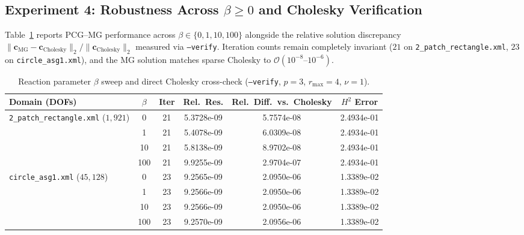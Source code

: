 \documentclass[11pt,a4paper]{article}
\begin{document}
\subsection{Experiment 4: Robustness Across $\beta \ge 0$ and Cholesky Verification}
Table~\ref{tab:beta_verify} reports PCG--MG performance across $\beta \in \{0, 1, 10, 100\}$ alongside the relative solution discrepancy $\|\mathbf{c}_{\mathrm{MG}} - \mathbf{c}_{\mathrm{Cholesky}}\|_2 / \|\mathbf{c}_{\mathrm{Cholesky}}\|_2$ measured via \texttt{--verify}. Iteration counts remain completely invariant ($21$ on \texttt{2\_patch\_rectangle.xml}, $23$ on \texttt{circle\_asg1.xml}), and the MG solution matches sparse Cholesky to $\mathcal{O}(10^{-8}\text{--}10^{-6})$.

\begin{table}[htbp]
\centering
\caption{Reaction parameter $\beta$ sweep and direct Cholesky cross-check (\texttt{--verify}, $p=3$, $r_{\max}=4$, $\nu=1$).}
\label{tab:beta_verify}
\small
\begin{tabular}{lccccc}
\toprule
Domain (DOFs) & $\beta$ & Iter & Rel.\ Res. & Rel.\ Diff.\ vs.\ Cholesky & $H^2$ Error \\
\midrule
\multirow{4}{*}{\texttt{2\_patch\_rectangle.xml} ($1{,}921$)}
 & 0   & 21 & 5.3728e-09 & 5.7574e-08 & 2.4934e-01 \\
 & 1   & 21 & 5.4078e-09 & 6.0309e-08 & 2.4934e-01 \\
 & 10  & 21 & 5.8138e-09 & 8.9702e-08 & 2.4934e-01 \\
 & 100 & 21 & 9.9255e-09 & 2.9704e-07 & 2.4934e-01 \\
\midrule
\multirow{4}{*}{\texttt{circle\_asg1.xml} ($45{,}128$)}
 & 0   & 23 & 9.2565e-09 & 2.0950e-06 & 1.3389e-02 \\
 & 1   & 23 & 9.2566e-09 & 2.0950e-06 & 1.3389e-02 \\
 & 10  & 23 & 9.2566e-09 & 2.0950e-06 & 1.3389e-02 \\
 & 100 & 23 & 9.2570e-09 & 2.0956e-06 & 1.3389e-02 \\
\bottomrule
\end{tabular}
\end{table}

\end{document}
